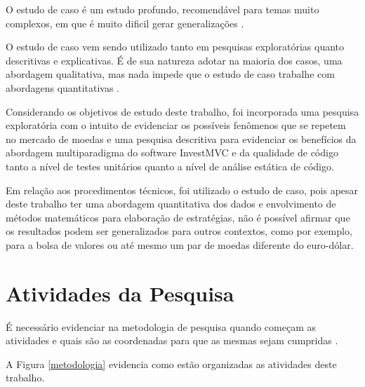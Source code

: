 O estudo de caso é um estudo profundo, recomendável para temas muito complexos, em que é muito dificil gerar generalizações \cite[pág.~33]{fonseca2002}.

O estudo de caso vem sendo utilizado tanto em pesquisas exploratórias quanto descritivas e explicativas. É de sua natureza adotar na maioria dos casos, uma abordagem qualitativa, mas nada impede que o estudo de caso trabalhe com abordagens quantitativas \cite[pág.~22]{yin}.

Considerando os objetivos de estudo deste trabalho, foi incorporada uma pesquisa exploratória com o intuito de evidenciar os possíveis fenômenos que se repetem no mercado de moedas e uma pesquisa descritiva para evidenciar os benefícios da abordagem multiparadigma do software InvestMVC e da qualidade de código tanto a nível de testes unitários quanto a nível de análise estática de código.

Em relação aos procedimentos técnicos, foi utilizado o estudo de caso, pois apesar deste trabalho ter uma abordagem quantitativa dos dados e envolvimento de métodos matemáticos para elaboração de estratégias, não é possível afirmar que os resultados podem ser generalizados para outros contextos, como por exemplo, para a bolsa de valores ou até mesmo um par de moedas diferente do euro-dólar.

\section{Atividades da Pesquisa}

É necessário evidenciar na metodologia de pesquisa quando começam as atividades e quais são as coordenadas para que as mesmas sejam cumpridas \cite{forcon2014}.

A Figura \ref{metodologia} evidencia como estão organizadas as atividades deste trabalho.

